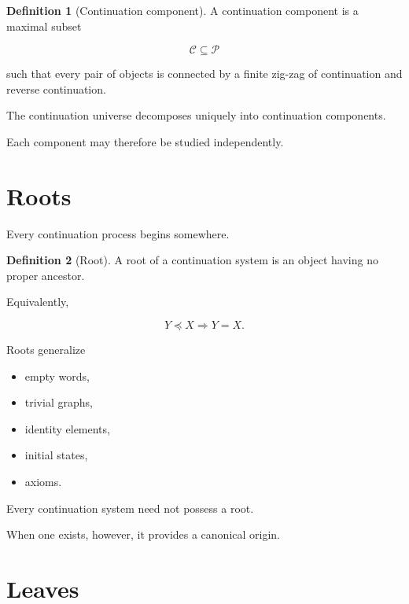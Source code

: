 \documentclass[13pt,openany]{book}
\theoremstyle{plain}
\theoremstyle{definition}
\newtheorem{definition}{Definition}[chapter]
\begin{document}
\begin{definition}[Continuation component]
A continuation component is a maximal subset

\[
\mathcal C
\subseteq
\mathcal P
\]

such that every pair of objects is connected by a finite zig-zag of
continuation and reverse continuation.
\end{definition}

The continuation universe decomposes uniquely into continuation
components.

Each component may therefore be studied independently.

\section{Roots}

Every continuation process begins somewhere.

\begin{definition}[Root]
A root of a continuation system is an object having no proper ancestor.

Equivalently,

\[
Y\preceq X
\Longrightarrow
Y=X.
\]
\end{definition}

Roots generalize

\begin{itemize}

\item empty words,

\item trivial graphs,

\item identity elements,

\item initial states,

\item axioms.

\end{itemize}

Every continuation system need not possess a root.

When one exists, however, it provides a canonical origin.

\section{Leaves}
\end{document}
